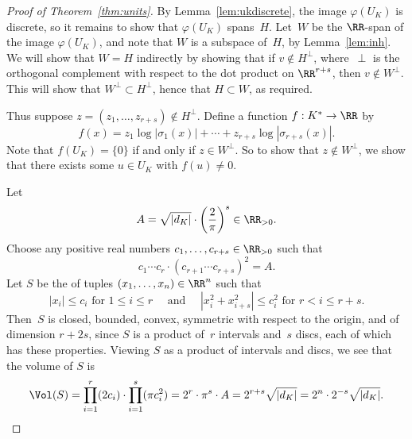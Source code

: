 \begin{proof}[Proof of Theorem~\ref{thm:units}]
  By Lemma~\ref{lem:ukdiscrete}, the image $\varphi(U_K)$ is discrete,
  so it remains to show that $\varphi(U_K)$ spans~$H$.
  Let~$W$ be the $\RR$-span of the image $\varphi(U_K)$, and note that $W$ is a
  subspace of~$H$, by Lemma~\ref{lem:inh}. 
  We will show that $W=H$ indirectly by showing that if $v\not \in H^{\perp}$,
  where~$\perp$ is the orthogonal complement with respect to the dot product
  on $\RR^{r+s}$, then $v\not \in W^{\perp}$.
  This will show that $W^{\perp}\subset H^{\perp}$, hence that $H\subset W$,
  as required.
  
  Thus suppose $z=(z_1,\dots,z_{r+s})\not\in H^{\perp}$.
  Define a function $f:K^*\to \RR$ by
  \begin{equation}\label{eqn:f}
    f(x) = z_1\log|\sigma_1(x)| + \cdots + z_{r+s}\log|\sigma_{r+s}(x)|.
  \end{equation}
  Note that $f(U_K)=\{0\}$ if and only if $z\in W^{\perp}$. So to show
  that $z\not\in W^{\perp}$, we show that there exists some $u\in U_K$
  with $f(u)\neq 0$.
  
  Let
  \[
    A=\sqrt{|d_K|} \cdot \left( \frac{2}{\pi}\right)^s \in \RR_{>0}.
  \]
  Choose any positive real numbers $c_1,\dots, c_{r+s} \in \RR_{>0}$ such that
  \[
    c_1\cdots c_r\cdot (c_{r+1}\cdots c_{r+s})^2 = A.
  \]
  Let $S$ be the of tuples $(x_1,\dots,x_n) \in \RR^n$ such that
  \[
    |x_i|\leq c_i\text{ for } 1\leq i \leq r
    \quad\text{ and }\quad
    |x_i^2 + x_{i+s}^2| \leq c_i^2 \text{ for } r<i\leq r+s.
  \]
  Then~$S$ is closed, bounded, convex, symmetric with respect to the
  origin, and of dimension $r+2s$, since $S$ is a product of~$r$ intervals
  and~$s$ discs, each of which has these properties. Viewing $S$ as a product
  of intervals and discs, we see that the volume of $S$ is
  \[
    \Vol(S)
    = \prod_{i=1}^r (2c_i) \cdot \prod_{i=1}^s (\pi c_i^2)
    = 2^r\cdot \pi^s \cdot A
    = 2^{r+s}\sqrt{|d_K|}
    = 2^n \cdot 2^{-s}\sqrt{|d_K|}.
  \]
  

\end{proof}

